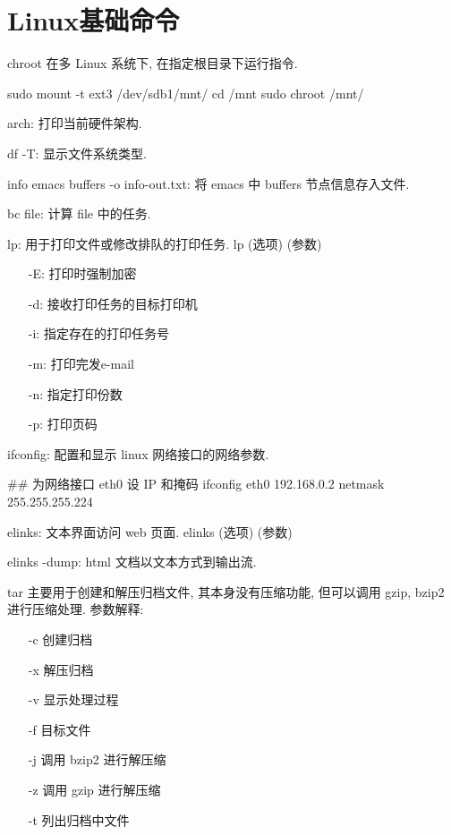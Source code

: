 \chapter{Linux基础命令}

chroot 在多 Linux 系统下, 在指定根目录下运行指令.
\begin{shell}
sudo mount -t ext3 /dev/sdb1/mnt/
cd /mnt
sudo chroot /mnt/
\end{shell}

arch: 打印当前硬件架构.

df -T: 显示文件系统类型.

info emacs buffers -o info-out.txt: 将 emacs 中 buffers 节点信息存入文件.

bc file: 计算 file 中的任务.

lp: 用于打印文件或修改排队的打印任务. lp (选项) (参数)
\begin{itemize}
 \item[-E:] 打印时强制加密
 \item[-d:] 接收打印任务的目标打印机
 \item[-i:] 指定存在的打印任务号
 \item[-m:] 打印完发e-mail
 \item[-n:] 指定打印份数
 \item[-p:] 打印页码
\end{itemize}

ifconfig: 配置和显示 linux 网络接口的网络参数.
\begin{shell}
## 为网络接口 eth0 设 IP 和掩码
ifconfig eth0 192.168.0.2 netmask 255.255.255.224
\end{shell}

elinks: 文本界面访问 web 页面. elinks (选项) (参数)
\begin{shell}
elinks -dump: html 文档以文本方式到输出流.
\end{shell}

tar 主要用于创建和解压归档文件, 其本身没有压缩功能, 但可以调用 gzip, bzip2 进行压缩处理.
参数解释:
\begin{itemize}
 \item[-c] 创建归档
 \item[-x] 解压归档
 \item[-v] 显示处理过程
 \item[-f] 目标文件
 \item[-j] 调用 bzip2 进行解压缩
 \item[-z] 调用 gzip 进行解压缩
 \item[-t] 列出归档中文件
\end{itemize}

